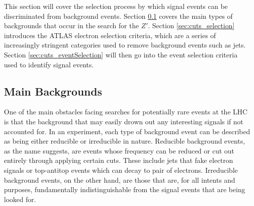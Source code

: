 \documentclass{article}
\begin{document}
This section will cover the selection process by which signal events can be discriminated from background events. Section \ref{sec:cuts_mainBackgrounds} covers the main types of backgrounds that occur in the search for the $Z'$. Section \ref{sec:cuts_selection} introduces the ATLAS electron selection criteria, which are a series of increasingly stringent categories used to remove background events such as jets. 
Section \ref{sec:cuts_eventSelection} will then go into the event selection criteria used to identify signal events. 

\subsection{Main Backgrounds}%
\label{sec:cuts_mainBackgrounds}

One of the main obstacles facing searches for potentially rare events at the LHC is that the background that may easily drown out any interesting signals if not accounted for. In an experiment, each type of background event can be described as being either reducible or irreducible in nature. Reducible background events, as the name suggests, are events whose frequency can be reduced or cut out entirely through applying certain cuts. These include jets that fake electron signals or top-antitop events which can decay to pair of electrons. Irreducible background events, on the other hand, are those that are, for all intents and purposes, fundamentally indistinguishable from the signal events that are being looked for. 
\end{document}
